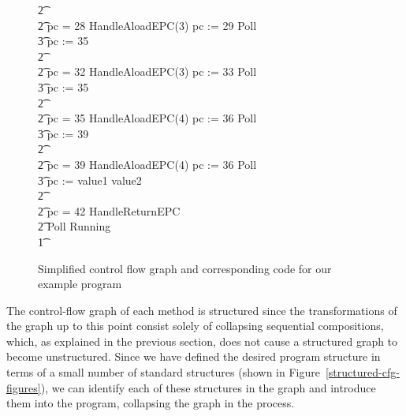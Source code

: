 \begin{figure}
\begin{center}
\begin{minipage}{0.65\linewidth}
\begin{circus}
        \t2 {} \cdots {} \\
        \t2 {} \circelse pc = 28 \circthen HandleAloadEPC(3) \circseq pc := 29 \circseq Poll \circseq \cdots \circseq \\
        \t3 pc := 35 \\
        \t2 {} \cdots {} \\
        \t2 {} \circelse pc = 32 \circthen HandleAloadEPC(3) \circseq pc := 33 \circseq Poll \circseq \cdots \circseq \\
        \t3 pc := 35 \\
        \t2 {} \cdots {} \\
        \t2 {} \circelse pc = 35 \circthen HandleAloadEPC(4) \circseq pc := 36 \circseq Poll \circseq \cdots \circseq \\
        \t3 pc := 39 \\
        \t2 {} \cdots {} \\
        \t2 {} \circelse pc = 39 \circthen HandleAloadEPC(4) \circseq pc := 36 \circseq Poll \circseq \cdots \circseq \\
        \t3 pc := \IF value1 \leq value2   \\
        \t2 {} \cdots {} \\
        \t2 {} \circelse pc = 42 \circthen HandleReturnEPC \\
        \t2 \circfi \circseq Poll \circseq Running \\
        \t1 \circfi
      \end{circus}
    \end{minipage}
  \end{center}
  \caption{Simplified control flow graph and corresponding code for our example
    program}
  \label{example-simplified-control-flow-graph-figure}
\end{figure}


The control-flow graph of each method is structured since the
transformations of the graph up to this point consist solely of
collapsing sequential compositions, which, as explained in the
previous section, does not cause a structured graph to become
unstructured.
Since we have defined the desired program structure in terms of a
small number of standard structures (shown in
Figure~\ref{structured-cfg-figures}), we can identify each of these
structures in the graph and introduce them into the program,
collapsing the graph in the process.

